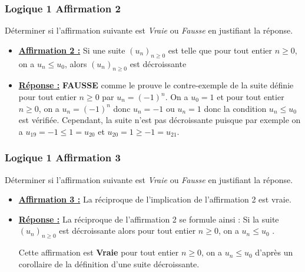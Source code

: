 \documentclass[11pt, hyperref={urlcolor=red,%
            linkcolor=blue, %
            colorlinks=true}]{beamer}
\newcommand{\Suite}[2]{\ensuremath{\left(#1\right)_{#2}}}
\begin{document}
		
	
\begin{frame}
\frametitle{Logique 1 Affirmation 2}

Déterminer si l'affirmation suivante est  \textit{Vraie} ou \textit{Fausse} en justifiant la réponse. 



\begin{itemize}
    \item \underline{\textbf{Affirmation 2 :}}
Si une suite $\Suite{u_{n}}{n\geqslant 0}$ est telle que pour tout entier $n \geqslant 0$, on a $u_{n} \leqslant u_{0}$, alors $\Suite{u_{n}}{n\geqslant 0}$ est décroissante

\pause \item  \underline{\textbf{Réponse :}} \textbf{ FAUSSE} comme le prouve le contre-exemple de la suite définie pour tout entier $n \geqslant 0$ par $u_{n}=(-1)^{n}$.  On a $u_{0}=1$ et pour tout entier $n \geqslant 0$, on a $u_{n}=(-1)^{n}$ donc $u_{n} = -1$ ou $u_{n}=1$ donc la condition $u_{n} \leqslant u_{0}$ est vérifiée. Cependant, la suite n'est pas décroissante puisque par exemple on a $u_{19}=-1 \leqslant 1=u_{20}$ et $u_{20}=1 \geqslant -1=u_{21}$.
\end{itemize}
	

\end{frame}


	
	
\begin{frame}
\frametitle{Logique 1 Affirmation 3}

Déterminer si l'affirmation suivante est  \textit{Vraie} ou \textit{Fausse} en justifiant la réponse. 



\begin{itemize}
    \item \underline{\textbf{Affirmation 3 :}}
La réciproque de l'implication de l'affirmation 2 est vraie.

\pause \item  \underline{\textbf{Réponse :}}  La réciproque de l'affirmation 2 se formule ainsi :    \og{}Si la suite $\Suite{u_{n}}{n\geqslant 0}$ est décroissante alors pour tout entier $n \geqslant 0$, on a $u_{n} \leqslant u_{0}$ \fg{}.

Cette affirmation est \textbf{Vraie} pour tout entier $n \geqslant 0$, on a $u_{n} \leqslant u_{0}$ d'après un corollaire de la définition d'une suite décroissante.
\end{itemize}
	

\end{frame}
\end{document}
